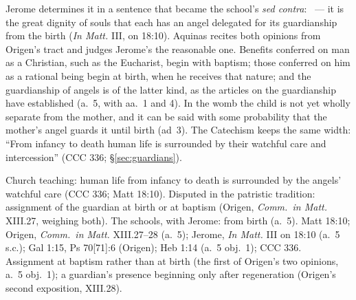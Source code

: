 Jerome determines it in a sentence that became the school's \emph{sed
contra}: ~--- it is the great
dignity of souls that each has an angel delegated for its guardianship
from the birth (\emph{In Matt.} III, on 18:10). Aquinas recites both
opinions from Origen's tract and judges Jerome's the reasonable one.
Benefits conferred on man as a Christian, such as the Eucharist, begin
with baptism; those conferred on him as a rational being begin at birth,
when he receives that nature; and the guardianship of angels is of the
latter kind, as the articles on the guardianship have established (a.~5,
with aa.~1 and 4). In the womb the child is not yet wholly separate from
the mother, and it can be said with some probability that the mother's
angel guards it until birth (ad~3). The Catechism keeps the same width:
``From infancy to death human life is surrounded by their watchful care
and intercession'' (CCC 336; \S\ref{sec:guardians}).

 {Church teaching: human life from infancy to death is surrounded by
  the angels' watchful care (CCC 336; Matt 18:10). Disputed in the
  patristic tradition: assignment of the guardian at birth or at baptism
  (Origen, \emph{Comm.\ in Matt.} XIII.27, weighing both). The schools,
  with Jerome: from birth (a.~5).}
 {Matt 18:10; Origen, \emph{Comm.\ in Matt.} XIII.27--28 (a.~5);
  Jerome, \emph{In Matt.} III on 18:10 (a.~5 s.c.); Gal 1:15, Ps
  70[71]:6 (Origen); Heb 1:14 (a.~5 obj.~1); CCC 336.}
 {Assignment at baptism rather than at birth (the first of Origen's two
  opinions, a.~5 obj.~1); a guardian's presence beginning only after
  regeneration (Origen's second exposition, XIII.28).}
